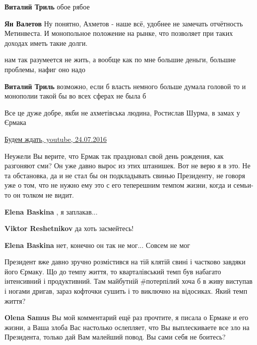 \begin{itemize}
\begin{itemize} %
\textbf{Виталий Триль} обое рябое

\textbf{Ян Валетов} Ну понятно, Ахметов - наше всё, удобнее не замечать отчётность Метинвеста. И монопольное положение на рынке, что позволяет при таких доходах иметь такие долги.

нам так разумеется не жить, а вообще как по мне большие деньги, большие проблемы, нафиг оно надо

\textbf{Виталий Триль} возможно, если б власть немного больше думала головой то и монополии такой бы во всех сферах не была б
\end{itemize} %

Все це дуже добре, якби не ахметівська людина, Ростислав Шурма, в замах у Єрмака


\href{https://youtu.be/jBkSHQB0srI}{%
Будем ждать, youtube, 24.07.2016%
}


Неужели Вы верите, что Ермак так праздновал свой день рождения, как разгоняют
сми? Он уже давно вырос из этих штанишек. Вот не верю я в это. Не та
обстановка, да и не стал бы он подкладывать свинью Президенту, не говоря уже о
том, что не нужно ему это с его теперешним темпом жизни, когда и семьи-то он
толком не видит.

\begin{itemize} %
\textbf{Elena Baskina} , я заплакав...

\textbf{Viktor Reshetnikov} да хоть засмейтесь!

\textbf{Elena Baskina} нет, конечно он так не мог... Совсем не мог


Президент вже давно зручно розмістився на тій клятій свині і частково завдяки
його Єрмаку. Що до темпу життя, то кварталівський темп був набагато інтенсивний
і продуктивний. Там майбутній #потерпілий хоча б в живу виступав і ногами
дригав, зараз кофточки сушить і то виключно на відосиках. Який темп життя?


\textbf{Olena Samus} Вы мой комментарий ещё раз прочтите, я писала о Ермаке и его жизни, а Ваша злоба Вас настолько ослепляет, что Вы выплескиваете все зло на Президента, только дай Вам малейший повод. Вы сами себя не боитесь?


\end{itemize}
\end{itemize}
